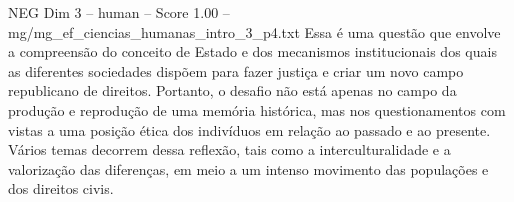 \begin{textsample}{NEG Dim 3 – human – Score 1.00 – mg/mg\_ef\_ciencias\_humanas\_intro\_3\_p4.txt}  \label{ex:f3_neg_012}
Essa é uma questão que envolve a compreensão do conceito de Estado e dos mecanismos institucionais dos quais as diferentes sociedades dispõem para fazer justiça e criar um novo campo republicano de direitos.
Portanto, o desafio não está apenas no campo da produção e reprodução de uma memória histórica, mas nos questionamentos com vistas a uma posição ética dos indivíduos em relação ao passado e ao presente.
Vários temas decorrem dessa reflexão, tais como a interculturalidade e a valorização das diferenças, em meio a um intenso movimento das populações e dos direitos civis.

\end{textsample}
